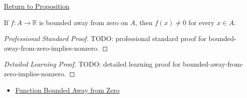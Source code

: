 \newpage
{}
\label{prf:bounded-away-from-zero-implies-nonzero}

\begin{remark*}[Return]
\hyperref[prop:bounded-away-from-zero-implies-nonzero]{Return to Proposition}
\end{remark*}

\begin{proposition*}
If \(f:A\to\mathbb{R}\) is bounded away from zero on \(A\), then
\(f(x)\neq0\) for every \(x\in A\).
\end{proposition*}

\begin{proof}[Professional Standard Proof]
\LRAProofBodyStart
TODO: professional standard proof for bounded-away-from-zero-implies-nonzero.
\end{proof}

\begin{proof}[Detailed Learning Proof]
\LRAProofBodyStart
TODO: detailed learning proof for bounded-away-from-zero-implies-nonzero.
\end{proof}

\begin{remark*}
\end{remark*}

\begin{dependencies}
\begin{itemize}
  \item \hyperref[def:function-bounded-away-from-zero]{Function Bounded Away from Zero}
\end{itemize}
\end{dependencies}

\clearpage
